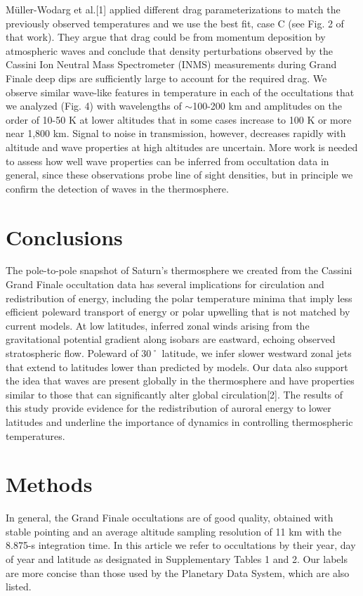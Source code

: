 Müller-Wodarg et al.[1] applied different drag parameterizations to match the previously observed temperatures and we use the best fit, case C (see Fig. 2 of that work). They argue that drag could be from momentum deposition by atmospheric waves and conclude that density perturbations observed by the Cassini Ion Neutral Mass Spectrometer (INMS) measurements during Grand Finale deep dips are sufficiently large to account for the required drag. We observe similar wave-like features in temperature in each of the occultations that we analyzed (Fig. 4) with wavelengths of $\sim$100-200 km and amplitudes on the order of 10-50 K at lower altitudes that in some cases increase to 100 K or more near 1,800 km. Signal to noise in transmission, however, decreases rapidly with altitude and wave properties at high altitudes are uncertain. More work is needed to assess how well wave properties can be inferred from occultation data in general, since these observations probe line of sight densities, but in principle we confirm the detection of waves in the thermosphere.

\section{Conclusions}

The pole-to-pole snapshot of Saturn’s thermosphere we created from the Cassini Grand Finale occultation data has several implications for circulation and redistribution of energy, including the polar temperature minima that imply less efficient poleward transport of energy or polar upwelling that is not matched by current models. At low latitudes, inferred zonal winds arising from the gravitational potential gradient along isobars are eastward, echoing observed stratospheric flow. Poleward of 30˚ latitude, we infer slower westward zonal jets that extend to latitudes lower than predicted by models. Our data also support the idea that waves are present globally in the thermosphere and have properties similar to those that can significantly alter global circulation[2]. The results of this study provide evidence for the redistribution of auroral energy to lower latitudes and underline the importance of dynamics in controlling thermospheric temperatures.

\section{Methods}

In general, the Grand Finale occultations are of good quality, obtained with stable pointing and an average altitude sampling resolution of 11 km with the 8.875-s integration time. In this article we refer to occultations by their year, day of year and latitude as designated in Supplementary Tables 1 and 2. Our labels are more concise than those used by the Planetary Data System, which are also listed.

